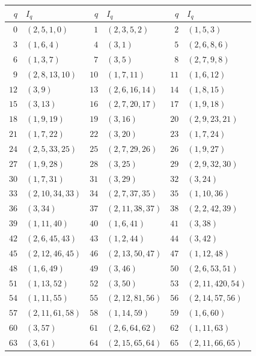 {\fontsize{9}{11}\selectfont
\setlength{\tabcolsep}{4pt}
\begin{longtable}{@{}rl@{\qquad}rl@{\qquad}rl@{}}
\toprule
\(q\)&\(I_q\)&\(q\)&\(I_q\)&\(q\)&\(I_q\)\\
\midrule
\endhead
\bottomrule
\endlastfoot
\(0\)&\((2,5,1,0)\) & \(1\)&\((2,3,5,2)\) & \(2\)&\((1,5,3)\)\\
\(3\)&\((1,6,4)\) & \(4\)&\((3,1)\) & \(5\)&\((2,6,8,6)\)\\
\(6\)&\((1,3,7)\) & \(7\)&\((3,5)\) & \(8\)&\((2,7,9,8)\)\\
\(9\)&\((2,8,13,10)\) & \(10\)&\((1,7,11)\) & \(11\)&\((1,6,12)\)\\
\(12\)&\((3,9)\) & \(13\)&\((2,6,16,14)\) & \(14\)&\((1,8,15)\)\\
\(15\)&\((3,13)\) & \(16\)&\((2,7,20,17)\) & \(17\)&\((1,9,18)\)\\
\(18\)&\((1,9,19)\) & \(19\)&\((3,16)\) & \(20\)&\((2,9,23,21)\)\\
\(21\)&\((1,7,22)\) & \(22\)&\((3,20)\) & \(23\)&\((1,7,24)\)\\
\(24\)&\((2,5,33,25)\) & \(25\)&\((2,7,29,26)\) & \(26\)&\((1,9,27)\)\\
\(27\)&\((1,9,28)\) & \(28\)&\((3,25)\) & \(29\)&\((2,9,32,30)\)\\
\(30\)&\((1,7,31)\) & \(31\)&\((3,29)\) & \(32\)&\((3,24)\)\\
\(33\)&\((2,10,34,33)\) & \(34\)&\((2,7,37,35)\) & \(35\)&\((1,10,36)\)\\
\(36\)&\((3,34)\) & \(37\)&\((2,11,38,37)\) & \(38\)&\((2,2,42,39)\)\\
\(39\)&\((1,11,40)\) & \(40\)&\((1,6,41)\) & \(41\)&\((3,38)\)\\
\(42\)&\((2,6,45,43)\) & \(43\)&\((1,2,44)\) & \(44\)&\((3,42)\)\\
\(45\)&\((2,12,46,45)\) & \(46\)&\((2,13,50,47)\) & \(47\)&\((1,12,48)\)\\
\(48\)&\((1,6,49)\) & \(49\)&\((3,46)\) & \(50\)&\((2,6,53,51)\)\\
\(51\)&\((1,13,52)\) & \(52\)&\((3,50)\) & \(53\)&\((2,11,420,54)\)\\
\(54\)&\((1,11,55)\) & \(55\)&\((2,12,81,56)\) & \(56\)&\((2,14,57,56)\)\\
\(57\)&\((2,11,61,58)\) & \(58\)&\((1,14,59)\) & \(59\)&\((1,6,60)\)\\
\(60\)&\((3,57)\) & \(61\)&\((2,6,64,62)\) & \(62\)&\((1,11,63)\)\\
\(63\)&\((3,61)\) & \(64\)&\((2,15,65,64)\) & \(65\)&\((2,11,66,65)\)\\

\end{longtable}}
